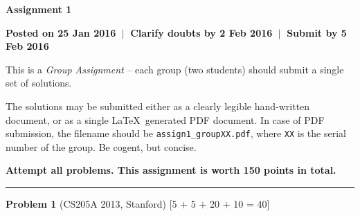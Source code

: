 \documentclass[11pt,a4paper]{article}
\begin{document}
\begin{center}
  
  \textbf{\Huge Assignment 1}

  \vspace*{10pt}  

  \textbf{Posted on 25 Jan 2016 $ \ \vert \ $ Clarify doubts by 2 Feb 2016 $ \ \vert \ $ Submit by 5 Feb 2016}

  \vspace*{10pt}  

  This is a \emph{Group Assignment} -- each group (two students) should submit a single set of solutions. 

  \vspace*{10pt}  
  
  The solutions may be submitted either as a clearly legible hand-written document, or as a single \LaTeX\ generated PDF document. In case of PDF submission, the filename should be \texttt{assign1\_groupXX.pdf}, where \texttt{XX} is the serial number of the group. Be cogent, but concise.
    
  \vspace*{10pt}  

  \textbf{Attempt all problems. This assignment is worth 150 points in total.}

  \vspace*{20pt}

  \hrule

  \vspace*{10pt}
   
\end{center}


{\large\textbf{Problem 1}} (CS205A 2013, Stanford) \hfill [5 + 5 + 20 + 10 = 40]
\end{document}
